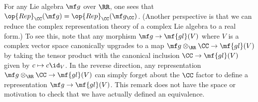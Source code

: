 \documentclass[../notes.tex]{subfiles}
\begin{document}
\begin{remark} \label{rem:rep-theory-complexification}
	For any Lie algebra $\mf g$ over $\RR$, one sees that $\op{Rep}_\CC(\mf g)=\op{Rep}_\CC(\mf g_\CC)$. (Another perspective is that we can reduce the complex representation theory of a complex Lie algebra to a real form.) To see this, note that any morphism $\mf g\to\mf{gl}(V)$ where $V$ is a complex vector space canonically upgrades to a map $\mf g\otimes_\RR\CC\to\mf{gl}(V)$ by taking the tensor product with the canonical inclusion $\CC\to\mf{gl}(V)$ given by $c\mapsto c\id_V$. In the reverse direction, any representation $\mf g\otimes_\RR\CC\to\mf{gl}(V)$ can simply forget about the $\CC$ factor to define a representation $\mf g\to\mf{gl}(V)$. This remark does not have the space or motivation to check that we have actually defined an equivalence.
\end{remark}
\end{document}
